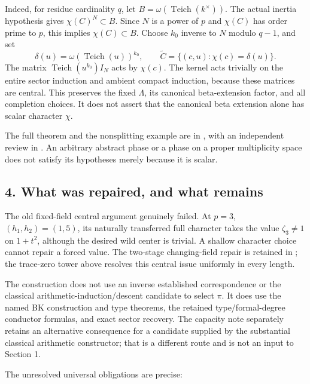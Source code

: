 Indeed, for residue cardinality \(q\), let
\(B=\omega(\operatorname{Teich}(k^\times))\). The actual inertia
hypothesis gives \(\chi(C)^N\subset B\). Since \(N\) is a power of \(p\)
and \(\chi(C)\) has order prime to \(p\), this implies
\(\chi(C)\subset B\). Choose \(k_0\) inverse to \(N\) modulo \(q-1\),
and set \[
\delta(u)=\omega(\operatorname{Teich}(u))^{k_0},\qquad
\widetilde C=\{(c,u):\chi(c)=\delta(u)\}.
\] The matrix \(\operatorname{Teich}(u^{k_0})I_N\) acts by \(\chi(c)\).
The kernel acts trivially on the entire sector induction and ambient
compact induction, because these matrices are central. This preserves
the fixed \(\Lambda\), its canonical beta-extension factor, and all
completion choices. It does not assert that the canonical beta extension
alone has scalar character \(\chi\).

The full theorem and the nonsplitting example are in
, with an
independent review in . An
arbitrary abstract phase or a phase on a proper multiplicity space does
not satisfy its hypotheses merely because it is scalar.

\hypertarget{odd_synthesis-what-was-repaired-and-what-remains}{%
\subsection{4. What was repaired, and what
remains}\label{odd_synthesis-what-was-repaired-and-what-remains}}

The old fixed-field central argument genuinely failed. At \(p=3\),
\((h_1,h_2)=(1,5)\), its naturally transferred full character takes the
value \(\zeta_3\ne1\) on \(1+t^2\), although the desired wild center is
trivial. A shallow character choice cannot repair a forced value. The
two-stage changing-field repair is retained in
; the trace-zero tower above
resolves this central issue uniformly in every length.

The construction does not use an inverse established correspondence or
the classical arithmetic-induction/descent candidate to select \(\pi\).
It does use the named BK construction and type theorems, the retained
type/formal-degree conductor formulas, and exact sector recovery. The
capacity note separately retains an alternative consequence for a
candidate supplied by the substantial classical arithmetic constructor;
that is a different route and is not an input to Section 1.

The unresolved universal obligations are precise:


